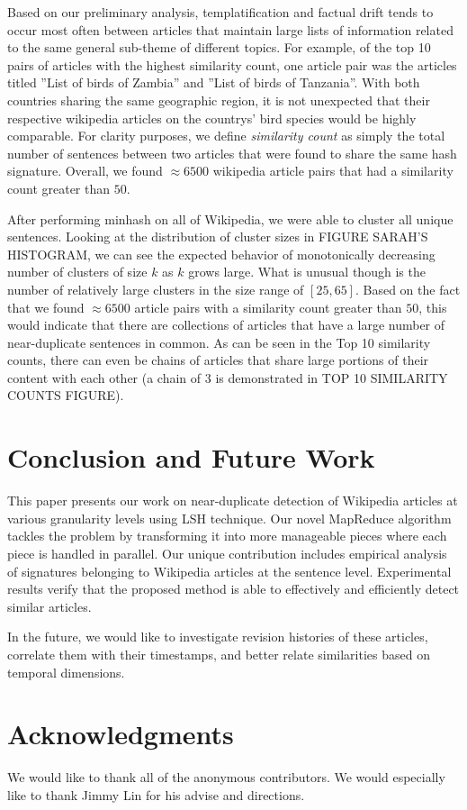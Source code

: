 \documentclass{acm_proc_article-sp}
\begin{document}
Based on our preliminary analysis, templatification and factual drift tends to occur most often between articles that maintain large lists of information related to the same general sub-theme of different topics. For example, of the top 10 pairs of articles with the highest similarity count, one article pair was the articles titled ''List of birds of Zambia'' and ''List of birds of Tanzania''. With both countries sharing the same geographic region, it is not unexpected that their respective wikipedia articles on the countrys' bird species would be highly comparable. For clarity purposes, we define \emph{similarity count} as simply the total number of sentences between two articles that were found to share the same hash signature. Overall, we found $\approx 6500$ wikipedia article pairs that had a similarity count greater than $50$.

After performing minhash on all of Wikipedia, we were able to cluster all unique sentences. Looking at the distribution of cluster sizes in FIGURE SARAH'S HISTOGRAM, we can see the expected behavior of monotonically decreasing number of clusters of size $k$ as $k$ grows large. What is unusual though is the number of relatively large clusters in the size range of $[25, 65]$. Based on the fact that we found $\approx 6500$ article pairs with a similarity count greater than $50$, this would indicate that there are collections of articles that have a large number of near-duplicate sentences in common. As can be seen in the Top 10 similarity counts, there can even be chains of articles that share large portions of their content with each other (a chain of 3 is demonstrated in TOP 10 SIMILARITY COUNTS FIGURE).


\section{Conclusion and Future Work}
This paper presents our work on near-duplicate detection of Wikipedia articles at various granularity levels using LSH technique. Our novel MapReduce algorithm tackles the problem by transforming it into more manageable pieces where each piece is handled in parallel. Our unique contribution includes empirical analysis of signatures belonging to Wikipedia articles at the sentence level. Experimental results verify that the proposed method is able to effectively and efficiently detect similar articles.

In the future, we would like to investigate revision histories of these articles, correlate them with their timestamps, and better relate similarities based on temporal dimensions. 

\section{Acknowledgments}
We would like to thank all of the anonymous contributors. We would especially like to thank Jimmy Lin for his advise and directions.



\balancecolumns
\end{document}
